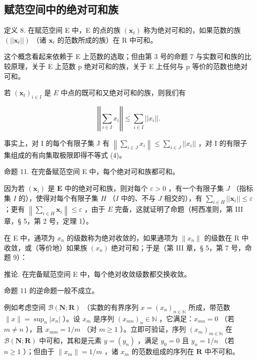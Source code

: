 \subsection{赋范空间中的绝对可和族}

定义 8. 在赋范空间 E 中，E 的点的族 \((\pmb{x}_{t})\) 称为绝对可和的，如果范数的族 \((||\pmb{x}_{t}||)\) （诸 \(\pmb{x}_{t}\) 的范数所成的族）在 R 中可和。

这个概念看起来依赖于 E 上范数的选取；但由第 3 号的命题 7 与实数可和族的比较原理，关于 E 上范数 p 绝对可和的族，关于 E 上任何与 p 等价的范数也绝对可和。

若 \((\pmb{x}_t)_{i\in I}\) 是 \(E\) 中点的既可和又绝对可和的族，则我们有

\[
\left| \left| \sum_ {i \in I} x _ {i} \right| \right| \leqslant \sum_ {i \in I} | | x _ {i} | |.\tag{4}
\]

事实上，对 I 的每个有限子集 J 有 \(\left\|\sum_{i\in J}x_{i}\right\| \leqslant \sum_{i\in J}||x_{i}||\) ，对 I 的有限子集组成的有向集取极限即得不等式 (4)。

命题 11. 在完备赋范空间 E 中，每个绝对可和族都可和。

因为若 \((\pmb{x}_i)\) 是 \(\mathbf{E}\) 中的绝对可和族，则对每个 \(\varepsilon > 0\) ，有一个有限子集 \(J\) （指标集 \(I\) 的），使得对每个有限子集 \(H\) （\(I\) 中的、不与 \(J\) 相交的），有 \(\sum_{i \in H} ||\pmb{x}_i|| \leqslant \varepsilon\) ；更有 \(\left\| \sum_{i \in H} \pmb{x}_i \right\| \leqslant \varepsilon\) ，由于 \(E\) 完备，这就证明了命题（柯西准则，第 III 章，§ 5，第 2 号，定理 1）。

在 E 中，通项为 \(x_{n}\) 的级数称为绝对收敛的，如果通项为 \(\|x_{n}\|\) 的级数在 R 中收敛，或（等价地）如果族 \((x_{n})\) 绝对可和；于是（第 III 章，§ 5，第 7 号，命题 9）：

推论. 在完备赋范空间 E 中，每个绝对收敛级数都交换收敛。

命题 11 的逆命题一般不成立。

例如考虑空间 \(\mathcal{B}(\mathbf{N};\mathbf{R})\) （实数的有界序列 \(x = (x_{n})_{n\in \mathbb{N}}\) 所成，带范数 \(\| x\| = \sup_n |x_n|\) ）。设 \(x_{m}\) 是序列 \((x_{mn})_n\in \mathbb{N}\) ，它满足：\(x_{mn} = 0\) （若 \(m\neq n\) ），且 \(x_{mm} = 1 / m\) （对 \(m\geqslant 1\) ）。立即可验证，序列 \((x_m)_{m\in \mathbb{N}}\) 在 \(\mathcal{B}(\mathbf{N};\mathbf{R})\) 中可和，其和是元素 \(y = (y_{n})\) ，满足 \(y_0 = 0\) 且 \(y_{n} = 1 / n\) （若 \(n\geqslant 1\) ）；但由于 \(\| x_m\| = 1 / m\) ，诸 \(x_{m}\) 的范数组成的序列在 \(\mathbf{R}\) 中不可和。


